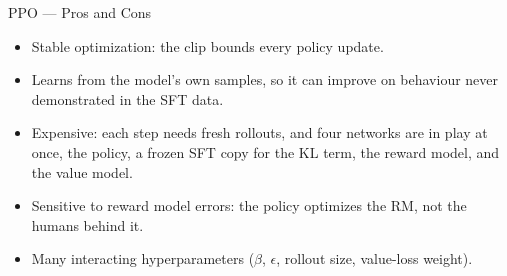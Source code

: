 \begin{frame}[t]{PPO --- Pros and Cons}
  \begin{itemize}\itemsep0.5em
    \item[\textcolor{red}{\checkmark}] Stable optimization: the clip bounds every policy update.
    \item[\textcolor{red}{\checkmark}] Learns from the model's own samples, so it can improve on behaviour never demonstrated in the SFT data.
    \item[\textcolor{gray}{\texttimes}] Expensive: each step needs fresh rollouts, and four networks are in play at once, the policy, a frozen SFT copy for the KL term, the reward model, and the value model.
    \item[\textcolor{gray}{\texttimes}] Sensitive to reward model errors: the policy optimizes the RM, not the humans behind it.
    \item[\textcolor{gray}{\texttimes}] Many interacting hyperparameters ($\beta$, $\epsilon$, rollout size, value-loss weight).
  \end{itemize}
\end{frame}
